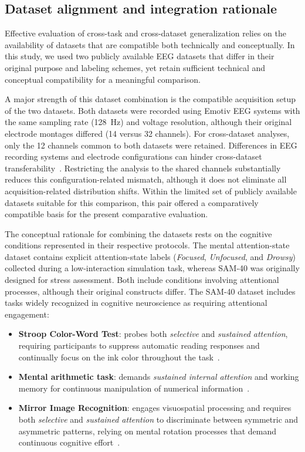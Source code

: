 \documentclass[10pt,letterpaper]{article}
\begin{document}
\subsection*{Dataset alignment and integration rationale}

Effective evaluation of cross-task and cross-dataset generalization relies on the availability of datasets that are compatible both technically and conceptually. In this study, we used two publicly available EEG datasets that differ in their original purpose and labeling schemes, yet retain sufficient technical and conceptual compatibility for a meaningful comparison.

A major strength of this dataset combination is the compatible acquisition setup of the two datasets. Both datasets were recorded using Emotiv EEG systems with the same sampling rate (128~Hz) and voltage resolution, although their original electrode montages differed (14 versus 32 channels). For cross-dataset analyses, only the 12 channels common to both datasets were retained. Differences in EEG recording systems and electrode configurations can hinder cross-dataset transferability~\cite{lan2019domain}. Restricting the analysis to the shared channels substantially reduces this configuration-related mismatch, although it does not eliminate all acquisition-related distribution shifts. Within the limited set of publicly available datasets suitable for this comparison, this pair offered a comparatively compatible basis for the present comparative evaluation.

The conceptual rationale for combining the datasets rests on the cognitive conditions represented in their respective protocols. The mental attention-state dataset contains explicit attention-state labels (\textit{Focused}, \textit{Unfocused}, and \textit{Drowsy}) collected during a low-interaction simulation task, whereas SAM-40 was originally designed for stress assessment. Both include conditions involving attentional processes, although their original constructs differ. The SAM-40 dataset includes tasks widely recognized in cognitive neuroscience as requiring attentional engagement:
\begin{itemize}
    \item \textbf{Stroop Color-Word Test}: probes both \textit{selective} and \textit{sustained attention}, requiring participants to suppress automatic reading responses and continually focus on the ink color throughout the task~\cite{macleod1991stroop, scarpina2017stroop, esterman2013zone}.
    \item \textbf{Mental arithmetic task}: demands \textit{sustained internal attention} and working memory for continuous manipulation of numerical information~\cite{grabner2007math, kitaura2017functional}.
    \item \textbf{Mirror Image Recognition}: engages visuospatial processing and requires both \textit{selective} and \textit{sustained attention} to discriminate between symmetric and asymmetric patterns, relying on mental rotation processes that demand continuous cognitive effort~\cite{shepard1971mental, hyun2007visual, tomasino2016mental}.
\end{itemize}
\end{document}
